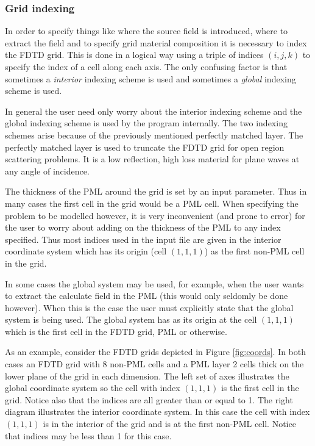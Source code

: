 \documentclass[a4paper, 12pt]{article}
\begin{document}
	\subsubsection{Grid indexing}
	\label{sec:gridscheme}
	In order to specify things like where the source field is introduced,
	where to extract the field and to specify grid material composition it
	is necessary to index the FDTD grid. This is done in a logical way
	using a triple of indices $(i,j,k)$ to specify the index of a cell
	along each axis. The only confusing factor is that sometimes a
	\emph{interior} indexing scheme is used and sometimes a \emph{global}
	indexing scheme is used.

	In general the user need only worry about the interior indexing scheme
	and the global indexing scheme is used by the program internally. The
	two indexing schemes arise because of the previously mentioned
	perfectly matched layer. The perfectly matched layer is used to
	truncate the FDTD grid for open region scattering problems. It is a
	low reflection, high loss material for plane waves at any angle of
	incidence.

	The thickness of the PML around the grid is set by an input
	parameter. Thus in many cases the first cell in the grid would be a
	PML cell. When specifying the problem to be modelled however, it is very
	inconvenient (and prone to error) for the user to worry about adding on the thickness of
	the PML to any index specified. Thus most indices used in the input
	file are given in the interior coordinate system which has its origin
	(cell $(1,1,1)$) as the first non-PML cell in the grid.

	In some cases the global system may be used, for example, when the
	user wants to extract the calculate field in the PML (this would only
	seldomly be done however). When this is the
	case the user must explicitly state that the global system is being
	used. The global system has as its origin at the cell $(1,1,1)$ which is
	the first cell in the FDTD grid, PML or otherwise.

	As an example, consider the FDTD grids depicted in Figure
	\ref{fig:coords}. In both cases an FDTD grid with 8 non-PML cells and
	a PML layer 2 cells thick on the lower plane of the grid in each
	dimension. The left set of axes illustrates the global coordinate
	system so the cell with index $(1,1,1)$ is the first cell in the
	grid. Notice also that the indices are all greater than or equal to
	1. The right diagram illustrates the interior coordinate system. In this
	case the cell with index $(1,1,1)$ is in the interior of the grid and
	is at the first non-PML cell. Notice that indices may be less than 1
	for this case.
\end{document}

